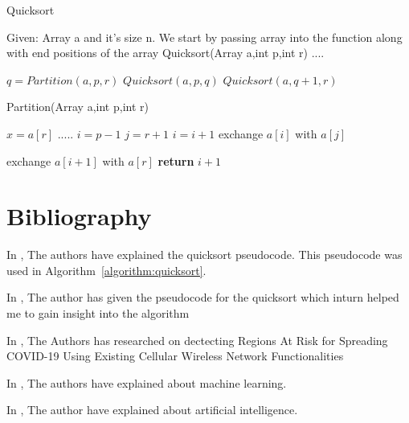 \documentclass{article}
\begin{document}
\begin{algorithm}
        \caption{Quicksort}
        \label{algorithm:quicksort}
        \begin{algorithmic}[1]
            \STATE Given: Array a and it's size n.
            \STATE
            \STATE We start by passing array into the function along with end positions of the array
            \STATE 
            \STATE Quicksort(Array a,int p,int r) \hfill    ....
                \begin{algorithmic}[1]
                    \STATE $q = Partition(a,p,r)$
                    \STATE $Quicksort(a,p,q)$
                    \STATE $Quicksort(a,q+1,r)$
                    \ENDIF  
                \end{algorithmic}
            \STATE
            \STATE Partition(Array a,int p,int r)
            \begin{algorithmic}[1]
                \STATE $x = a[r]$ \hfill     .....
                \STATE $i = p-1$
                \STATE $j = r+1$
                \STATE
                \STATE $i = i+1$
                \STATE exchange $a[i]$ with $a[j]$
                \ENDIF
                \ENDFOR
                
                \noindent \STATE exchange $a[i+1]$ with $a[r]$
                \STATE \textbf{return} $i+1$
               
            \end{algorithmic}
            
        \end{algorithmic}
\end{algorithm}
\newpage
\section{Bibliography}



In \cite{Cormen2009IntroductionTA}, The authors have explained the quicksort pseudocode. This pseudocode was used in Algorithm~\ref{algorithm:quicksort}.

In \cite{qsort}, The author has given the pseudocode for the quicksort which inturn helped me to gain insight into the algorithm

In \cite{9117073}, The Authors has researched on dectecting Regions At Risk for Spreading COVID-19 Using Existing Cellular Wireless Network Functionalities

In \cite{1527552}, The authors have explained about machine learning.

In \cite{5641441}, The author have explained about artificial intelligence.
\end{document}
